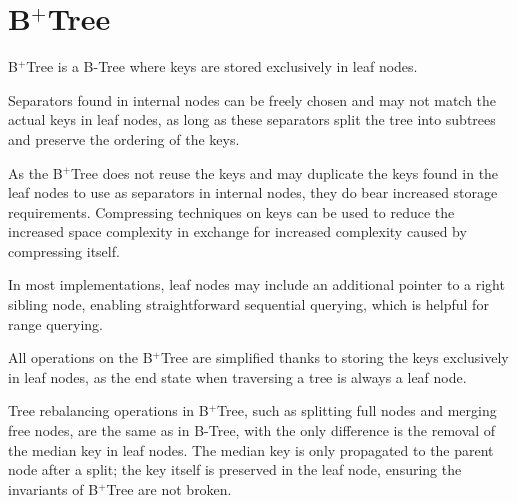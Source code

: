 \section{B$^+$Tree}

\begin{definition}
  B$^+$Tree is a B-Tree where keys are stored exclusively in leaf nodes.
\end{definition}

Separators found in internal nodes can be freely chosen and may not match the actual keys in leaf nodes, as long as these separators split the tree into subtrees and preserve the ordering of the keys.

As the B$^+$Tree does not reuse the keys and may duplicate the keys found in the leaf nodes to use as separators in internal nodes, they do bear increased storage requirements. Compressing techniques on keys can be used to reduce the increased space complexity in exchange for increased complexity caused by compressing itself.

In most implementations, leaf nodes may include an additional pointer to a right sibling node, enabling straightforward sequential querying, which is helpful for range querying.



All operations on the B$^+$Tree are simplified thanks to storing the keys exclusively in leaf nodes, as the end state when traversing a tree is always a leaf node.

Tree rebalancing operations in B$^+$Tree, such as splitting full nodes and merging free nodes, are the same as in B-Tree, with the only difference is the removal of the median key in leaf nodes. The median key is only propagated to the parent node after a split; the key itself is preserved in the leaf node, ensuring the invariants of B$^+$Tree are not broken.